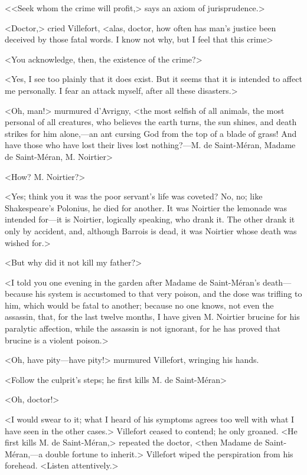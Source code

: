  <<Seek whom the crime will profit,> says an axiom of jurisprudence.> 

 <Doctor,> cried Villefort, <alas, doctor, how often has man's justice been deceived by those fatal words. I know not why, but I feel that this crime\longdash> 

 <You acknowledge, then, the existence of the crime?> 

 <Yes, I see too plainly that it does exist. But it seems that it is intended to affect me personally. I fear an attack myself, after all these disasters.> 

 <Oh, man!> murmured d'Avrigny, <the most selfish of all animals, the most personal of all creatures, who believes the earth turns, the sun shines, and death strikes for him alone,—an ant cursing God from the top of a blade of grass! And have those who have lost their lives lost nothing?—M. de Saint-Méran, Madame de Saint-Méran, M. Noirtier\longdash> 

 <How? M. Noirtier?> 

 <Yes; think you it was the poor servant's life was coveted? No, no; like Shakespeare's Polonius, he died for another. It was Noirtier the lemonade was intended for—it is Noirtier, logically speaking, who drank it. The other drank it only by accident, and, although Barrois is dead, it was Noirtier whose death was wished for.> 

 <But why did it not kill my father?> 

 <I told you one evening in the garden after Madame de Saint-Méran's death—because his system is accustomed to that very poison, and the dose was trifling to him, which would be fatal to another; because no one knows, not even the assassin, that, for the last twelve months, I have given M. Noirtier brucine for his paralytic affection, while the assassin is not ignorant, for he has proved that brucine is a violent poison.> 

 <Oh, have pity—have pity!> murmured Villefort, wringing his hands. 

 <Follow the culprit's steps; he first kills M. de Saint-Méran\longdash> 

 <Oh, doctor!> 

 <I would swear to it; what I heard of his symptoms agrees too well with what I have seen in the other cases.> Villefort ceased to contend; he only groaned. <He first kills M. de Saint-Méran,> repeated the doctor, <then Madame de Saint-Méran,—a double fortune to inherit.> Villefort wiped the perspiration from his forehead. <Listen attentively.> 

